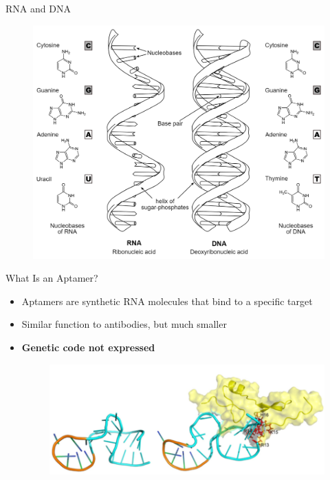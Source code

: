 \documentclass{beamer}
\begin{document}
\begin{frame}{RNA and DNA}
  \begin{figure}
    \begin{center}
      \includegraphics[width=1\textwidth]{rnadna.png}
    \end{center}
  \end{figure}
\end{frame}

\begin{frame}{What Is an Aptamer?}
\begin{itemize}
  \item Aptamers are synthetic RNA molecules that bind to a specific target
  \item Similar function to antibodies, but much smaller
  \item \textbf{Genetic code not expressed}
  \begin{figure}
    \begin{center}
      \includegraphics[width=1\textwidth]{aptamer.png}
    \end{center}  
  \end{figure}
\end{itemize}
  
\end{frame}
\end{document}
